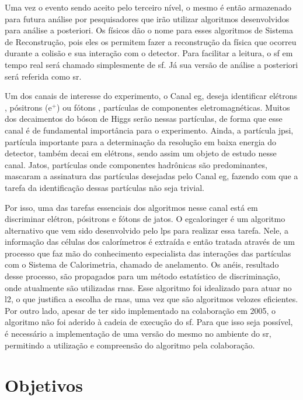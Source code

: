 Uma vez o evento sendo aceito pelo terceiro nível, o mesmo é então armazenado
para futura análise por pesquisadores que irão utilizar algoritmos desenvolvidos 
para análise a posteriori. Os físicos dão o nome para esses algoritmos de Sistema de
Reconstrução, pois eles os permitem fazer a reconstrução da física que ocorreu
durante a colisão e sua interação com o detector. Para facilitar a leitura, o
\glsdesc{sf} em tempo real será chamado simplesmente de \glsdesc{sf}.
Já sua versão de análise a posteriori será referida como \glsdesc{sr}.

Um dos canais de interesse do experimento, o Canal \acrshort{eg},
deseja identificar elétrons , pósitrons (e$^+$)
ou fótons , 
partículas de componentes eletromagnéticas. Muitos dos decaimentos do bóson de
Higgs serão nessas partículas, de forma que esse canal é de fundamental
importância para o experimento. Ainda, a partícula \acrshort{jpsi}, partícula importante
para a determinação da resolução em baixa energia do detector, 
também decai em elétrons, sendo assim um objeto de estudo nesse canal.
Jatos, partículas onde componentes hadrônicas são predominantes, 
mascaram a assinatura das partículas desejadas pelo Canal \acrshort{eg}, fazendo 
com que a tarefa da identificação dessas partículas não seja trivial.

Por isso, uma das tarefas essenciais dos algoritmos nesse canal está em 
discriminar elétron, pósitrons e fótons de jatos. O \gls{egcaloringer} é um algoritmo alternativo 
que vem sido desenvolvido pelo \gls{lps} para realizar essa tarefa. Nele,
a informação das células dos calorímetros é extraída e então tratada através de
um processo que faz mão do conhecimento especialista das interações das partículas 
com o Sistema de Calorimetria, chamado de anelamento. Os anéis, resultado desse
processo, são propagados para um método estatístico de discriminação, 
onde atualmente são utilizadas \glspl{rna}. Esse algoritmo foi idealizado para
atuar no \acrshort{l2}, o que justifica a escolha de \glspl{rna}, uma vez que são
algoritmos velozes eficientes. Por outro lado, apesar de ter sido implementado
na colaboração em 2005, o algoritmo não foi aderido à cadeia de execução do
\glsdesc{sf}. Para que isso seja possível, é necessário a implementação de uma versão do mesmo 
no ambiente do \glsdesc{sr}, permitindo a utilização e compreensão do algoritmo pela
colaboração.

\section{Objetivos} %

